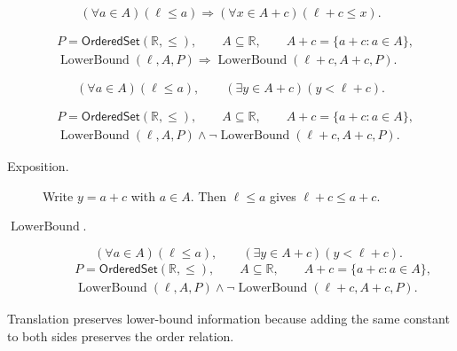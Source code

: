 \begin{remark*}
\[
(\forall a\in A)(\ell\leq a)
\Longrightarrow
(\forall x\in A+c)(\ell+c\leq x).
\]
\end{remark*}

\begin{remark*}
\[
\begin{aligned}
&P=\mathsf{OrderedSet}(\mathbb{R},\leq),\qquad
A\subseteq\mathbb{R},\qquad A+c=\{a+c:a\in A\},\\
&\operatorname{LowerBound}(\ell,A,P)\Longrightarrow\operatorname{LowerBound}(\ell+c,A+c,P).
\end{aligned}
\]
\end{remark*}

\begin{remark*}
\[
(\forall a\in A)(\ell\leq a),\qquad
(\exists y\in A+c)(y<\ell+c).
\]
\end{remark*}

\begin{remark*}
\[
\begin{aligned}
&P=\mathsf{OrderedSet}(\mathbb{R},\leq),\qquad
A\subseteq\mathbb{R},\qquad A+c=\{a+c:a\in A\},\\
&\operatorname{LowerBound}(\ell,A,P)\land\neg\operatorname{LowerBound}(\ell+c,A+c,P).
\end{aligned}
\]
\end{remark*}

\begin{remark*}
\begin{description}
\item[Exposition.]
Write $y=a+c$ with $a\in A$.  Then $\ell\leq a$ gives $\ell+c\leq a+c$.


  \item[\(\operatorname{LowerBound}.\)]
  \[
(\forall a\in A)(\ell\leq a),\qquad
(\exists y\in A+c)(y<\ell+c).
\]
\[
\begin{aligned}
&P=\mathsf{OrderedSet}(\mathbb{R},\leq),\qquad
A\subseteq\mathbb{R},\qquad A+c=\{a+c:a\in A\},\\
&\operatorname{LowerBound}(\ell,A,P)\land\neg\operatorname{LowerBound}(\ell+c,A+c,P).
\end{aligned}
\]
\end{description}
\end{remark*}

\begin{remark*}[Interpretation]
Translation preserves lower-bound information because adding the same constant
to both sides preserves the order relation.
\end{remark*}

